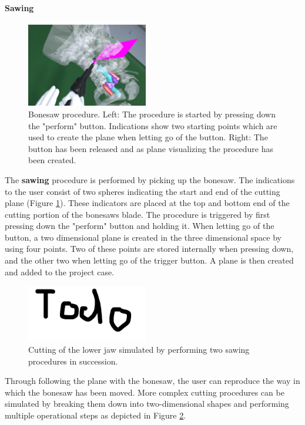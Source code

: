 \paragraph{Sawing}

\begin{figure}[ht]
    \centering
    \includegraphics[width=200px]{images/implementation/features/procedures/bonesaw.png}
    \caption{\label{fig::FeatureBoneSaw}Bonesaw procedure. Left: The procedure is started by pressing down the "perform" button. Indications show two starting points which are 
    used to create the plane when letting go of the button. Right: The button has been released and as plane visualizing the procedure has been created.}
\end{figure}

The \textbf{sawing} procedure is performed by picking up the bonesaw.
The indications to the user consist of two spheres indicating the start and end of the cutting plane (Figure \ref{fig::FeatureBoneSaw}).
These indicators are placed at the top and bottom end of the cutting portion of the bonesaws blade.
The procedure is triggered by first pressing down the "perform" button and holding it.
When letting go of the button, a two dimensional plane is created in the three dimensional space by using four points.
Two of these points are stored internally when pressing down, and the other two when letting go of the trigger button.
A plane is then created and added to the project case.

\begin{figure}[ht]
    \centering
    \includegraphics[width=200px]{images/todo.png}
    \caption{\label{fig::MultipleSawing}Cutting of the lower jaw simulated by performing two sawing procedures in succession.}
\end{figure}

Through following the plane with the bonesaw, the user can reproduce the way in which the bonesaw has been moved.
More complex cutting procedures can be simulated by breaking them down into two-dimensional shapes and performing multiple operational steps as depicted in Figure \ref{fig::MultipleSawing}.